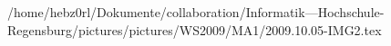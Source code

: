 /home/hebz0rl/Dokumente/collaboration/Informatik---Hochschule-Regensburg/pictures/pictures/WS2009/MA1/2009.10.05-IMG2.tex